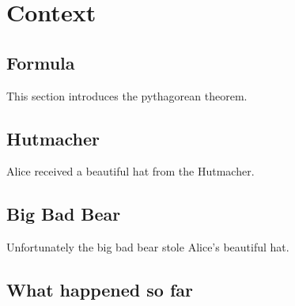 \chapter{Context}




\section{Formula}

This section introduces the pythagorean theorem.


\section{Hutmacher}

Alice received a beautiful hat from the Hutmacher.


\section{Big Bad Bear}

Unfortunately the big bad bear stole Alice's beautiful hat.


\section{What happened so far}

\contextPrintAll
